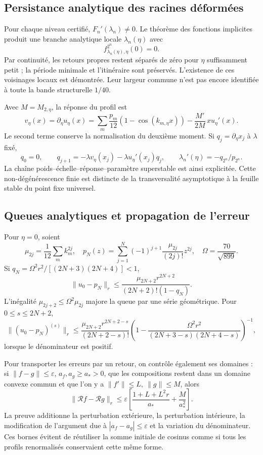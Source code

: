 \subsection{Persistance analytique des racines déformées}
\label{hmtfg:desarrollo:8}

Pour chaque niveau certifié, \(F_n'(\lambda_n)\ne0\). Le théorème des fonctions implicites produit une branche analytique locale \(\lambda_n(\eta)\) avec
\[
f_{\lambda_n(\eta),\eta}^{2^n}(0)=0.
\]
Par continuité, les retours propres restent séparés de zéro pour \(\eta\) suffisamment petit ; la période minimale et l’itinéraire sont préservés. L’existence de ces voisinages locaux est démontrée. Leur largeur commune n’est pas encore identifiée à toute la bande structurelle \(1/40\).

Avec \(M=M_{2,\eta}\), la réponse du profil est
\[
v_\eta(x)=\partial_\eta u_\eta(x)
=\sum_m\frac{p_m}{12}(1-\cos(k_{m,\eta}x))
-\frac{M'}{2M}\,x u_\eta'(x).
\]
Le second terme conserve la normalisation du deuxième moment. Si \(q_j=\partial_\eta x_j\) à \(\lambda\) fixé,
\[
q_0=0,\qquad q_{j+1}=-\lambda v_\eta(x_j)-\lambda u_\eta'(x_j)q_j,
\qquad
\boxed{\lambda_n'(\eta)=-q_{2^n}/p_{2^n}}.
\]
La chaîne poids–échelle–réponse–paramètre superstable est ainsi explicitée. Cette non-dégénérescence finie est distincte de la transversalité asymptotique à la feuille stable du point fixe universel.


\subsection{Queues analytiques et propagation de l’erreur}
\label{hmtfg:desarrollo:9}

Pour \(\eta=0\), soient
\[
\mu_{2j}=\frac1{12}\sum_mk_m^{2j},\quad
p_N(z)=\sum_{j=1}^N(-1)^{j+1}\frac{\mu_{2j}}{(2j)!}z^{2j},
\quad\Omega=\frac{70}{\sqrt{899}}.
\]
Si \(q_N=\Omega^2r^2/[(2N+3)(2N+4)]<1\),
\[
\|u_0-p_N\|_r\le
\frac{\mu_{2N+2}r^{2N+2}}{(2N+2)!(1-q_N)}.
\]
L’inégalité \(\mu_{2j+2}\le\Omega^2\mu_{2j}\) majore la queue par une série géométrique. Pour \(0\le s\le2N+2\),
\[
\|(u_0-p_N)^{(s)}\|_r\le
\frac{\mu_{2N+2}r^{2N+2-s}}{(2N+2-s)!}
\left(1-\frac{\Omega^2r^2}{(2N+3-s)(2N+4-s)}\right)^{-1},
\]
lorsque le dénominateur est positif.

Pour transporter les erreurs par un retour, on contrôle également ses domaines : si \(\|f-g\|\le\varepsilon\), \(a_f,a_g\ge a_*>0\), que les compositions restent dans un domaine convexe commun et que l’on y a \(\|f'\|\le L,\ \|g\|\le M\), alors
\[
\|\mathcal Rf-\mathcal Rg\|_r
\le\varepsilon\left[\frac{1+L+L^2r}{a_*}+\frac{M}{a_*^2}\right].
\]
La preuve additionne la perturbation extérieure, la perturbation intérieure, la modification de l’argument due à \(|a_f-a_g|\le\varepsilon\) et la variation du dénominateur. Ces bornes évitent de réutiliser la somme initiale de cosinus comme si tous les profils renormalisés conservaient cette même forme.
